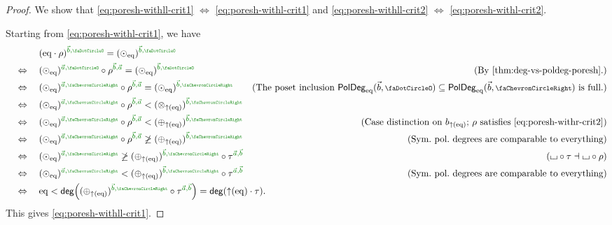 \documentclass[a4paper]{memoir}
\begin{document}
\begin{proof}
	We show that \cref{eq:poresh-withll-crit1} $\Leftrightarrow$ \cref{eq:poresh-withl-crit1} and \cref{eq:poresh-withll-crit2} $\Leftrightarrow$ \cref{eq:poresh-withl-crit2}.
	
	Starting from \cref{eq:poresh-withl-crit1}, we have
	\begin{align*}
		&\quad\mathrel{\phantom{\Leftrightarrow}}\quad
		(\eqtydeg \cdot \rho)\pmrhom{\vec b}{\npolar} =
		(\nonpol_\eqtydeg)\pmrhom{\vec b}{\npolar} \\
		&\quad\Leftrightarrow\quad
		(\nonpol_\eqtydeg)\pmrhom{\vec a}{\npolar} \circ \rho\pmrhom{\vec b}{\vec a} =
		(\nonpol_\eqtydeg)\pmrhom{\vec b}{\npolar}
		& \text{(By \cref{thm:deg-vs-poldeg-poresh}.)} \\
		&\quad\Leftrightarrow\quad
		(\nonpol_\eqtydeg)\pmrhom{\vec a}{\ypolar} \circ \rho\pmrhom{\vec b}{\vec a} =
		(\nonpol_\eqtydeg)\pmrhom{\vec b}{\ypolar}
		& \text{(The poset inclusion $\poldegeq(\vec b, \npolar) \subseteq \poldegeq(\vec b, \ypolar)$ is full.)} \\
		&\quad\Leftrightarrow\quad
		(\nonpol_\eqtydeg)\pmrhom{\vec a}{\ypolar} \circ \rho\pmrhom{\vec b}{\vec a} <
		(\mixpol_{\sucdeg(\eqtydeg)})\pmrhom{\vec b}{\ypolar} \\
		&\quad\Leftrightarrow\quad
		(\nonpol_\eqtydeg)\pmrhom{\vec a}{\ypolar} \circ \rho\pmrhom{\vec b}{\vec a} <
		(\pospol_{\sucdeg(\eqtydeg)})\pmrhom{\vec b}{\ypolar}
		& \text{(Case distinction on $b_{\sucdeg(\eqtydeg)}$; $\rho$ satisfies \cref{eq:poresh-withr-crit2})} \\
		&\quad\Leftrightarrow\quad
		(\nonpol_\eqtydeg)\pmrhom{\vec a}{\ypolar} \circ \rho\pmrhom{\vec b}{\vec a} \not\geq
		(\pospol_{\sucdeg(\eqtydeg)})\pmrhom{\vec b}{\ypolar}
		& \text{(Sym.\ pol.\ degrees are comparable to everything)} \\
		&\quad\Leftrightarrow\quad
		(\nonpol_\eqtydeg)\pmrhom{\vec a}{\ypolar} \not\geq
		(\pospol_{\sucdeg(\eqtydeg)})\pmrhom{\vec b}{\ypolar} \circ \tau\pmrhom{\vec a}{\vec b}
		& \text{($\loch \circ \tau \dashv \loch \circ \rho$)} \\
		&\quad\Leftrightarrow\quad
		(\nonpol_\eqtydeg)\pmrhom{\vec a}{\ypolar} <
		(\pospol_{\sucdeg(\eqtydeg)})\pmrhom{\vec b}{\ypolar} \circ \tau\pmrhom{\vec a}{\vec b}
		& \text{(Sym.\ pol.\ degrees are comparable to everything)} \\
		&\quad\Leftrightarrow\quad
		\eqtydeg <
		\getdeg \paren{  (\pospol_{\sucdeg(\eqtydeg)})\pmrhom{\vec b}{\ypolar} \circ \tau\pmrhom{\vec a}{\vec b}  } = \getdeg({\sucdeg(\eqtydeg)} \cdot \tau).\hspace{-10em}
	\end{align*}
	This gives \cref{eq:poresh-withll-crit1}.
	

\end{proof}
\end{document}

